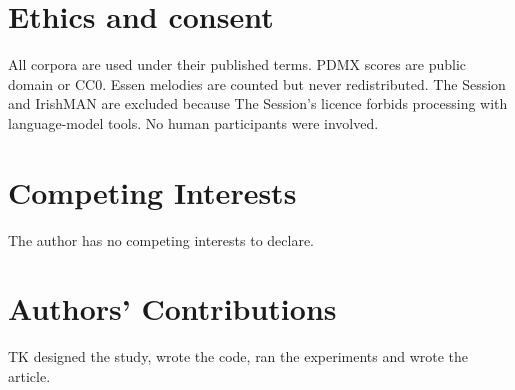 \documentclass[ProofPDF]{./Styles/Jnls-Template-V3}
\begin{document}
\section{Ethics and consent}
All corpora are used under their published terms. PDMX scores are public domain or CC0. Essen melodies are counted but never redistributed. The Session and IrishMAN are excluded because The Session's licence forbids processing with language-model tools. No human participants were involved.

\nolinenumbers
\theendnotes

\section*{Competing Interests}
The author has no competing interests to declare.

\section*{Authors' Contributions}
TK designed the study, wrote the code, ran the experiments and wrote the article.

\begin{authoraff}
\end{authoraff}
\clearpage




\label{endPage_Label}
\end{document}
